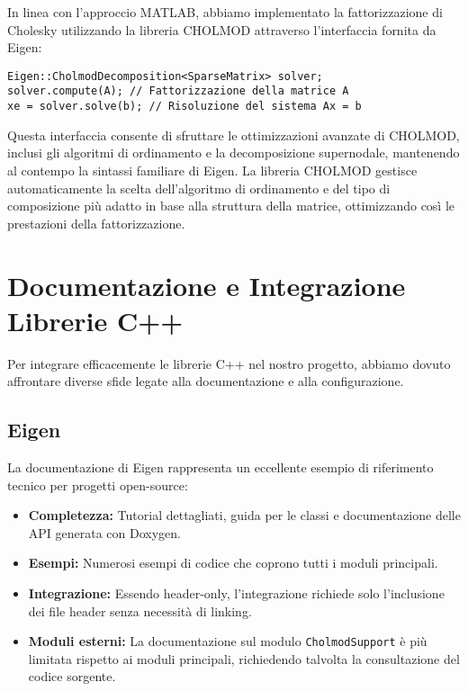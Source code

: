 In linea con l'approccio MATLAB, abbiamo implementato la fattorizzazione di Cholesky utilizzando la libreria CHOLMOD attraverso 
l'interfaccia fornita da Eigen:

\begin{verbatim}
Eigen::CholmodDecomposition<SparseMatrix> solver;
solver.compute(A); // Fattorizzazione della matrice A
xe = solver.solve(b); // Risoluzione del sistema Ax = b
\end{verbatim}

Questa interfaccia consente di sfruttare le ottimizzazioni avanzate di CHOLMOD, inclusi gli algoritmi di ordinamento e 
la decomposizione supernodale, mantenendo al contempo la sintassi familiare di Eigen. La libreria CHOLMOD gestisce 
automaticamente la scelta dell'algoritmo di ordinamento e del tipo di composizione più adatto in base alla struttura della matrice, 
ottimizzando così le prestazioni della fattorizzazione.

\section{Documentazione e Integrazione Librerie C++}

Per integrare efficacemente le librerie C++ nel nostro progetto, abbiamo dovuto affrontare diverse sfide legate alla documentazione e
alla configurazione.

\subsection{Eigen}

La documentazione di Eigen rappresenta un eccellente esempio di riferimento tecnico per progetti open-source:

\begin{itemize}
    \item \textbf{Completezza:} Tutorial dettagliati, guida per le classi e documentazione delle API generata con Doxygen.
    \item \textbf{Esempi:} Numerosi esempi di codice che coprono tutti i moduli principali.
    \item \textbf{Integrazione:} Essendo header-only, l'integrazione richiede solo l'inclusione dei file header senza necessità di linking.
    \item \textbf{Moduli esterni:} La documentazione sul modulo \texttt{CholmodSupport} è più limitata rispetto ai moduli 
    principali, richiedendo talvolta la consultazione del codice sorgente.
\end{itemize}

